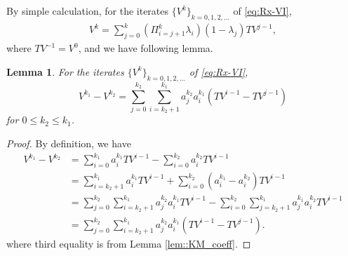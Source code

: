 \documentclass{article} %
\newcommand{\cP}{\mathcal{P}}
\newcommand*{\para}[1]{\left({#1}\right)}
\newtheorem{lemma}{Lemma}
\begin{document}
By simple calculation, for the iterates $\{V^k\}_{k=0, 1,2,\dots}$ of \ref{eq:Rx-VI},
\begin{align*}
   V^k = \sum^{k}_{j=0} \para{\Pi^{k}_{i=j+1}\lambda_{i}}(1-\lambda_{j}) TV^{j-1},
\end{align*}
where $TV^{-1}=V^0$, and we have following lemma.
\begin{lemma}\label{lem::KM_diff}
 For the iterates $\{V^k\}_{k=0, 1,2,\dots}$ of \ref{eq:Rx-VI},
    \[V^{k_1}-V^{k_2} = \sum^{k_2}_{j=0}\sum^{k_1}_{i=k_2+1} a^{k_2}_j  a^{k_1}_i  (TV^{i-1}-TV^{j-1})\]
for $0 \le k_2 \le k_1$.
\end{lemma}

\begin{proof}
By definition, we have
\begin{align*}
    V^{k_1}-V^{k_2} &=  \sum^{k_1}_{i=0} a^{k_1}_i TV^{i-1}- \sum^{k_2}_{i=0} a^{k_2}_iTV^{i-1}
    \\& =   \sum^{k_1}_{i=k_2+1} a^{k_1}_i TV^{i-1}+\sum^{k_2}_{i=0} (a^{k_1}_i-a^{k_2}_i)TV^{i-1}
    \\& =  \sum^{k_2}_{j=0}\sum^{k_1}_{i=k_2+1} a^{k_2}_j  a^{k_1}_i TV^{i-1}- \sum^{k_2}_{i=0} \sum^{k_1}_{j=k_2+1} a^{k_1}_ja^{k_2}_iTV^{i-1}
    \\& =  \sum^{k_2}_{j=0}\sum^{k_1}_{i=k_2+1} a^{k_2}_j  a^{k_1}_i  (TV^{i-1}-TV^{j-1}). \end{align*}
where third equality is from Lemma \ref{lem::KM_coeff}. 
\end{proof}
\end{document}
